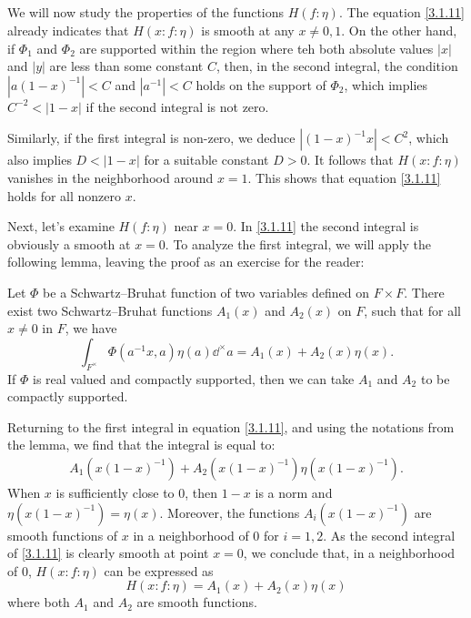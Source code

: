 \subsection{}
We will now study the properties of the functions $H(f:\eta)$.
The equation \eqref{3.1.11} already indicates that $H(x:f:\eta)$ is smooth at any $x \ne 0, 1$. 
On the other hand, if $\Phi_1$ and $\Phi_2$ are supported within the region where teh both absolute values $|x|$ and $|y|$ are less than some constant $C$, then, in the second integral, the condition $|a(1 - x)^{-1}| < C$ and $|a^{-1}| < C$ holds on the support of $\Phi_2$, which implies $C^{-2} < |1 - x|$ if the second integral is not zero.

Similarly, if the first integral is non-zero, we deduce $|(1-x)^{-1}x| < C^2$, which also implies $D < |1 - x|$ for a suitable constant $D > 0$.
It follows that $H(x:f:\eta)$ vanishes in the neighborhood around $x = 1$.
This shows that equation \eqref{3.1.11} holds for all nonzero $x$.

Next, let's examine $H(f:\eta)$ near $x = 0$.
In \eqref{3.1.11} the second integral is obviously a smooth at $x = 0$.
To analyze the first integral, we will apply the following lemma, leaving the proof as an exercise for the reader:
\begin{lemma}\label{lem:3.2}
    Let $\Phi$ be a Schwartz--Bruhat function of two variables defined on $F \times F$.
    There exist two Schwartz--Bruhat functions $A_1(x)$ and $A_2(x)$ on $F$, such that for all $x \neq 0$ in $F$, we have
    \[
    \int_{F^\times} \Phi(a^{-1}x, a)\eta(a) \dd^\times a = A_1(x) + A_2(x) \eta(x).
    \]
    If $\Phi$ is real valued and compactly supported, then we can take $A_1$ and $A_2$ to be compactly supported.
\end{lemma}

Returning to the first integral in equation \eqref{3.1.11}, and using the notations from the lemma, we find that the integral is equal to:
\begin{align}
    A_1(x(1-x)^{-1}) + A_2(x(1-x)^{-1})\eta(x(1-x)^{-1}).
\end{align}
When $x$ is sufficiently close to $0$, then $1 - x$ is a norm and $\eta(x(1-x)^{-1}) = \eta(x)$.
Moreover, the functions $A_i(x(1-x)^{-1})$ are smooth functions of $x$ in a neighborhood of 0 for $i = 1,2$.
As the second integral of \eqref{3.1.11} is clearly smooth at point $x = 0$, we conclude that, in a neighborhood of $0$, $H(x:f:\eta)$ can be expressed as
\begin{equation}
    H(x:f:\eta) = A_1(x) + A_2(x) \eta(x)
\end{equation}
where both $A_1$ and $A_2$ are smooth functions.

